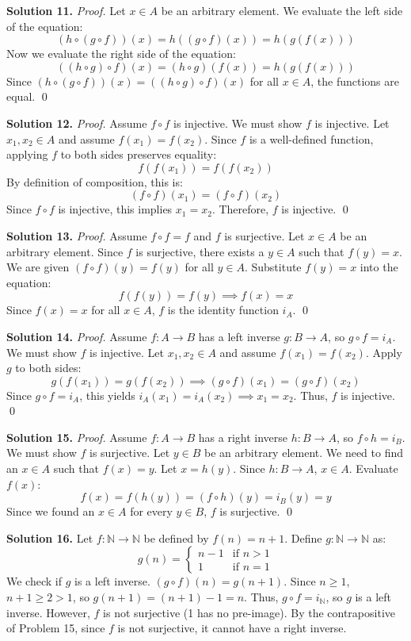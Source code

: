 \documentclass[11pt, letterpaper]{article}
\theoremstyle{definition}
\theoremstyle{remark}
\newcommand{\N}{\mathbb{N}}
\begin{document}
\textbf{Solution 11.}
\textit{Proof.} Let $x \in A$ be an arbitrary element. We evaluate the left side of the equation:
\[
(h \circ (g \circ f))(x) = h((g \circ f)(x)) = h(g(f(x)))
\]
Now we evaluate the right side of the equation:
\[
((h \circ g) \circ f)(x) = (h \circ g)(f(x)) = h(g(f(x)))
\]
Since $(h \circ (g \circ f))(x) = ((h \circ g) \circ f)(x)$ for all $x \in A$, the functions are equal.
\qed

\textbf{Solution 12.}
\textit{Proof.} Assume $f \circ f$ is injective. We must show $f$ is injective. Let $x_1, x_2 \in A$ and assume $f(x_1) = f(x_2)$. 
Since $f$ is a well-defined function, applying $f$ to both sides preserves equality:
\[
f(f(x_1)) = f(f(x_2))
\]
By definition of composition, this is:
\[
(f \circ f)(x_1) = (f \circ f)(x_2)
\]
Since $f \circ f$ is injective, this implies $x_1 = x_2$. Therefore, $f$ is injective.
\qed

\textbf{Solution 13.}
\textit{Proof.} Assume $f \circ f = f$ and $f$ is surjective. Let $x \in A$ be an arbitrary element. Since $f$ is surjective, there exists a $y \in A$ such that $f(y) = x$. 
We are given $(f \circ f)(y) = f(y)$ for all $y \in A$. 
Substitute $f(y) = x$ into the equation:
\[
f(f(y)) = f(y) \implies f(x) = x
\]
Since $f(x) = x$ for all $x \in A$, $f$ is the identity function $i_A$.
\qed

\textbf{Solution 14.}
\textit{Proof.} Assume $f: A \to B$ has a left inverse $g: B \to A$, so $g \circ f = i_A$. We must show $f$ is injective. Let $x_1, x_2 \in A$ and assume $f(x_1) = f(x_2)$. Apply $g$ to both sides:
\[
g(f(x_1)) = g(f(x_2)) \implies (g \circ f)(x_1) = (g \circ f)(x_2)
\]
Since $g \circ f = i_A$, this yields $i_A(x_1) = i_A(x_2) \implies x_1 = x_2$. Thus, $f$ is injective.
\qed

\textbf{Solution 15.}
\textit{Proof.} Assume $f: A \to B$ has a right inverse $h: B \to A$, so $f \circ h = i_B$. We must show $f$ is surjective. Let $y \in B$ be an arbitrary element. We need to find an $x \in A$ such that $f(x) = y$. 
Let $x = h(y)$. Since $h: B \to A$, $x \in A$. Evaluate $f(x)$:
\[
f(x) = f(h(y)) = (f \circ h)(y) = i_B(y) = y
\]
Since we found an $x \in A$ for every $y \in B$, $f$ is surjective.
\qed

\textbf{Solution 16.}
Let $f: \N \to \N$ be defined by $f(n) = n + 1$. 
Define $g: \N \to \N$ as:
\[
g(n) = 
\begin{cases} 
n - 1 & \text{if } n > 1 \\ 
1 & \text{if } n = 1 
\end{cases}
\]
We check if $g$ is a left inverse. $(g \circ f)(n) = g(n + 1)$. Since $n \ge 1$, $n + 1 \ge 2 > 1$, so $g(n + 1) = (n + 1) - 1 = n$. Thus, $g \circ f = i_\N$, so $g$ is a left inverse.
However, $f$ is not surjective (1 has no pre-image). By the contrapositive of Problem 15, since $f$ is not surjective, it cannot have a right inverse.
\end{document}
